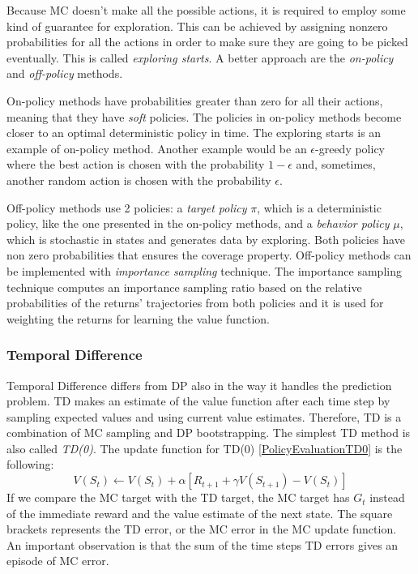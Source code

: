 Because MC doesn't make all the possible actions, it is required to employ some kind of guarantee for exploration. This can be achieved by assigning nonzero probabilities for all the actions in order to make sure they are going to be picked eventually. This is called \textit{exploring starts}. A better approach are the \textit{on-policy} and \textit{off-policy} methods. 

On-policy methods have probabilities greater than zero for all their actions, meaning that they have \textit{soft} policies. The policies in on-policy methods become closer to an optimal deterministic policy in time. The exploring starts is an example of on-policy method. Another example would be an $\epsilon$-greedy policy where the best action is chosen with the probability $1-\epsilon$ and, sometimes, another random action is chosen with the probability $\epsilon$.

Off-policy methods use 2 policies: a \textit{target policy} $\pi$, which is a deterministic policy, like the one presented in the on-policy methods, and a \textit{behavior policy} $\mu$, which is stochastic in states and generates data by exploring. Both policies have non zero probabilities that ensures the coverage property. Off-policy methods can be implemented with \textit{importance sampling} technique. The importance sampling technique computes an importance sampling ratio based on the relative probabilities of the returns' trajectories from both policies and it is used for weighting the returns for learning the value function.

\subsubsection{Temporal Difference}
Temporal Difference differs from DP also in the way it handles the prediction problem. TD makes an estimate of the value function after each time step by sampling expected values and using current value estimates. Therefore, TD is a combination of MC sampling and DP bootstrapping. The simplest TD method is also called \textit{TD(0)}. The update function for TD(0) \ref{PolicyEvaluationTD0} is the following:
\begin{equation}\label{PolicyEvaluationTD0}
V(S_{t})\leftarrow V(S_{t})+\alpha \left [ R_{t+1}+\gamma V(S_{t+1})-V(S_{t}) \right ]
\end{equation}
If we compare the MC target with the TD target, the MC target has $G_{t}$ instead of the immediate reward and the value estimate of the next state. The square brackets represents the TD error, or the MC error in the MC update function. An important observation is that the sum of the time steps TD errors gives an episode of MC error.


